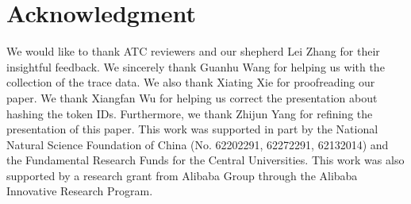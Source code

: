 \section*{Acknowledgment}
\noindent
We would like to thank ATC reviewers and our shepherd Lei Zhang for
their insightful feedback.
We sincerely thank Guanhu Wang for helping us with the collection of the trace data.
We also thank Xiating Xie for proofreading our paper. 
We thank Xiangfan Wu for helping us correct the presentation about hashing the token IDs.
Furthermore, we thank Zhijun Yang for refining the presentation of this paper.
This work was supported in part by
the National Natural Science Foundation of China (No. 62202291, 62272291, 62132014) and
the Fundamental Research Funds for the Central Universities. 
This work was also supported by
a research grant from Alibaba Group through the Alibaba Innovative Research Program.